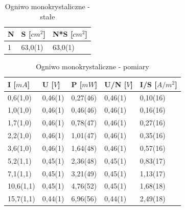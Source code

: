 \documentclass[12pt,a4paper]{article}
\begin{document}
\newpage

\begin{table}[H]
\centering
\caption{Ogniwo monokrystaliczne - stałe}
\label{monostale}
\begin{tabular}{|p{2cm}|p{2cm}|p{2cm}|}
\hline
N & S {[}$cm^2${]} & N*S {[}$cm^2${]}   \\
\hline
1 & 63,0(1) & 63,0(1) \\
\hline
\end{tabular}
\end{table}

\begin{table}[H]
\centering
\caption{Ogniwo monokrystaliczne - pomiary}
\label{mono}
\begin{tabular}{|p{2cm}|p{2cm}|p{2cm}|p{2cm}|p{2cm}|}
\hline
I {[}$mA${]}	& U {[}$V${]}	& P  {[}$mW${]}	& U/N {[}$V${]} & I/S {[}$A/m^2${]} \\ 
\hline
0,6(1,0)		& 0,46(1)		& 0,27(46)		& 0,46(1)		& 0,10(16)\\
1,0(1,0)		& 0,46(1)		& 0,46(46)		& 0,46(1)		& 0,16(16)\\
1,7(1,0)		& 0,46(1)		& 0,78(47)		& 0,46(1)		& 0,27(16)\\
2,2(1,0)		& 0,46(1)		& 1,01(47)		& 0,46(1)		& 0,35(16)\\
3,6(1,0)		& 0,46(1)		& 1,64(48)		& 0,46(1)		& 0,57(16)\\
5,2(1,1)		& 0,45(1)		& 2,36(48)		& 0,45(1)		& 0,83(17)\\
7,1(1,1)		& 0,45(1)		& 3,21(49)		& 0,45(1)		& 1,13(17)\\
10,6(1,1)		& 0,45(1)		& 4,76(52)		& 0,45(1)		& 1,68(18)\\
15,7(1,1)		& 0,44(1)		& 6,96(56)		& 0,44(1)		& 2,49(18)\\
\hline
\end{tabular}
\end{table}
\end{document}
